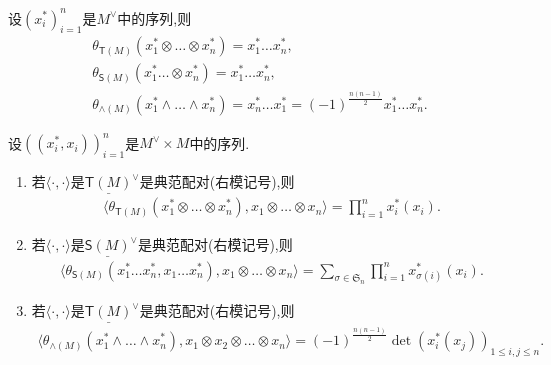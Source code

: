 \begin{proposition}{}{}
	设$\left(x_{i}^{\ast}\right)_{i=1}^{n}$是$M^{\vee}$中的序列,则
	\begin{gather*}
		\theta_{\mathsf{T}\left(M\right)}\left(x_{1}^{\ast}\otimes\ldots\otimes x_{n}^{\ast}\right)=x_{1}^{\ast}\ldots x_{n}^{\ast},\\
		\theta_{\mathsf{S}\left(M\right)}\left(x_{1}^{\ast}\ldots\otimes x_{n}^{\ast}\right)=x_{1}^{\ast}\ldots x_{n}^{\ast},\\
		\theta_{\wedge\left(M\right)}\left(x_{1}^{\ast}\wedge\ldots\wedge x_{n}^{\ast}\right)=x_{n}^{\ast}\ldots x_{1}^{\ast}=\left(-1\right)^{\frac{n\left(n-1\right)}{2}}x_{1}^{\ast}\ldots x_{n}^{\ast}.
	\end{gather*}
\end{proposition}

\begin{corollary}{}{}
	设$\left(\left(x_{i}^{\ast},x_{i}\right)\right)_{i=1}^{n}$是$M^{\vee}\times M$中的序列.
	\begin{enumerate}
		\item 若$\langle\cdot,\cdot\rangle$是$\underline{\mathsf{T}\left(M\right)}^{\vee}$是典范配对(右模记号),则
		\begin{align*}
			\langle\theta_{\mathsf{T}\left(M\right)}\left(x_{1}^{\ast}\otimes\ldots\otimes x_{n}^{\ast}\right),x_{1}\otimes\ldots\otimes x_{n}\rangle=\prod\limits_{i=1}^{n}x_{i}^{\ast}\left(x_{i}\right).
		\end{align*}
		\item 若$\langle\cdot,\cdot\rangle$是$\underline{\mathsf{S}\left(M\right)}^{\vee}$是典范配对(右模记号),则
		\begin{align*}
			\langle\theta_{\mathsf{S}\left(M\right)}\left(x_{1}^{\ast}\ldots x_{n}^{\ast},x_{1}\ldots x_{n}^{\ast}\right),x_{1}\otimes\ldots\otimes x_{n}\rangle=\sum\limits_{\sigma\in\mathfrak{S}_{n}}\prod\limits_{i=1}^{n}x_{\sigma\left(i\right)}^{\ast}\left(x_{i}\right).
		\end{align*}
		\item 若$\langle\cdot,\cdot\rangle$是$\underline{\mathsf{T}\left(M\right)}^{\vee}$是典范配对(右模记号),则
		\begin{align*}
			\langle\theta_{\wedge\left(M\right)}\left(x_{1}^{\ast}\wedge\ldots\wedge x_{n}^{\ast}\right),x_{1}\otimes x_{2}\otimes\ldots\otimes x_{n}\rangle=\left(-1\right)^{\frac{n\left(n-1\right)}{2}}\det\left(x_{i}^{\ast}\left(x_{j}\right)\right)_{1\leq i,j\leq n}.
		\end{align*}
	\end{enumerate}
\end{corollary}

